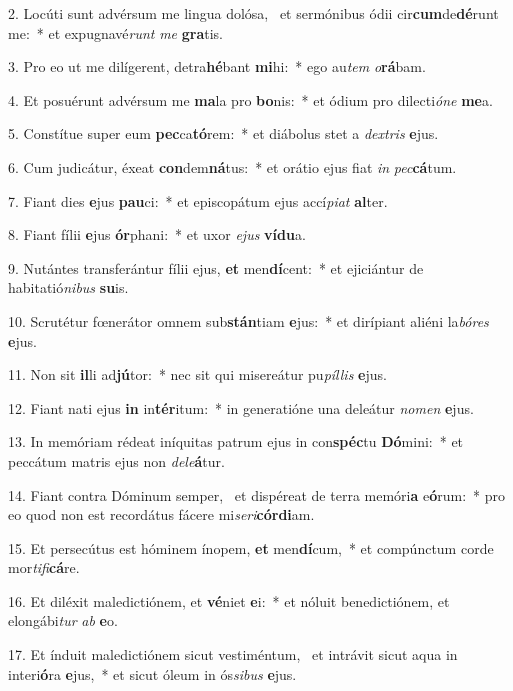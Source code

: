 2. Locúti sunt advérsum me lingua dolósa, \dag\  et sermónibus ódii cir\textbf{cum}de\textbf{dé}runt me:~*  et expugnavé\textit{runt} \textit{me} \textbf{gra}tis.\

3. Pro eo ut me dilígerent, detra\textbf{hé}bant \textbf{mi}hi:~*  ego au\textit{tem} \textit{o}\textbf{rá}bam.\

4. Et posuérunt advérsum me \textbf{ma}la pro \textbf{bo}nis:~*  et ódium pro dilecti\textit{ó}\textit{ne} \textbf{me}a.\

5. Constítue super eum \textbf{pec}ca\textbf{tó}rem:~*  et diábolus stet a \textit{dex}\textit{tris} \textbf{e}jus.\

6. Cum judicátur, éxeat \textbf{con}dem\textbf{ná}tus:~*  et orátio ejus fiat \textit{in} \textit{pec}\textbf{cá}tum.\

7. Fiant dies \textbf{e}jus \textbf{pau}ci:~*  et episcopátum ejus accí\textit{pi}\textit{at} \textbf{al}ter.\

8. Fiant fílii \textbf{e}jus \textbf{ór}phani:~*  et uxor \textit{e}\textit{jus} \textbf{ví}\textbf{du}a.\

9. Nutántes transferántur fílii ejus, \textbf{et} men\textbf{dí}cent:~*  et ejiciántur de habitatió\textit{ni}\textit{bus} \textbf{su}is.\

10. Scrutétur fœnerátor omnem sub\textbf{stán}tiam \textbf{e}jus:~*  et dirípiant aliéni la\textit{bó}\textit{res} \textbf{e}jus.\

11. Non sit \textbf{il}li ad\textbf{jú}tor:~*  nec sit qui misereátur pu\textit{píl}\textit{lis} \textbf{e}jus.\

12. Fiant nati ejus \textbf{in} in\textbf{tér}itum:~*  in generatióne una deleátur \textit{no}\textit{men} \textbf{e}jus.\

13. In memóriam rédeat iníquitas patrum ejus in con\textbf{spéc}tu \textbf{Dó}mini:~*  et peccátum matris ejus non \textit{de}\textit{le}\textbf{á}tur.\

14. Fiant contra Dóminum semper, \dag\  et dispéreat de terra memóri\textbf{a} e\textbf{ó}rum:~*  pro eo quod non est recordátus fácere mi\textit{se}\textit{ri}\textbf{cór}\textbf{di}am.\

15. Et persecútus est hóminem ínopem, \textbf{et} men\textbf{dí}cum,~*  et compúnctum corde mor\textit{ti}\textit{fi}\textbf{cá}re.\

16. Et diléxit maledictiónem, et \textbf{vé}niet \textbf{e}i:~*  et nóluit benedictiónem, et elongábi\textit{tur} \textit{ab} \textbf{e}o.\

17. Et índuit maledictiónem sicut vestiméntum, \dag\  et intrávit sicut aqua in interi\textbf{ó}ra \textbf{e}jus,~*  et sicut óleum in ós\textit{si}\textit{bus} \textbf{e}jus.\

